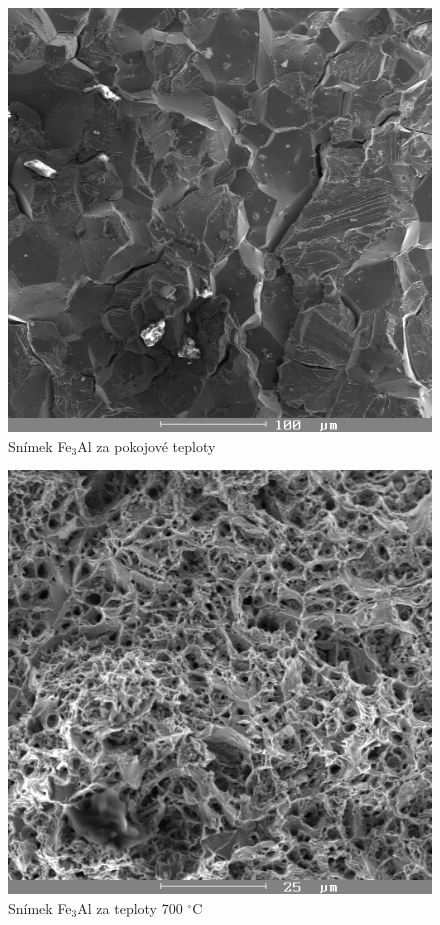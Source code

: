 \documentclass[a4paper,12pt]{article}
\begin{document}
\begin{figure}[!htb]
\begin{center}
\includegraphics[scale=.7]{B1.png}
\end{center}
\caption{Snímek Fe$_3$Al za pokojové teploty}
\label{o1}
\end{figure}

\begin{figure}[!htb]
\begin{center}
\includegraphics[scale=.7]{B2.png}
\end{center}
\caption{Snímek Fe$_3$Al za teploty 700 $^\circ$C}
\label{o2}
\end{figure}
\end{document}
